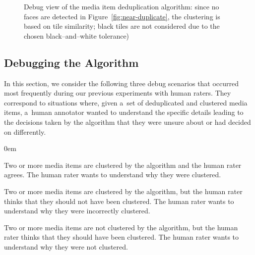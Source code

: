 \documentclass{article}
\begin{document}
\begin{figure}[t!]
  \centering
  \caption{Debug view of the media item deduplication algorithm: since no faces are detected in Figure~\ref{fig:near-duplicate}, the clustering is based on tile similarity; black tiles are not considered due to the chosen black--and--white tolerance)}
  \label{fig:algorithmdebug}
\end{figure}

\subsection{Debugging the Algorithm}
\label{sec:debugging-the-algorithm}
In this section, we consider the following three debug scenarios that occurred most frequently during our previous experiments with human raters. They correspond to situations where, given a~set of deduplicated and clustered media items, a~human annotator wanted to understand the specific details leading to the decisions taken by the algorithm that they were unsure about or had decided on differently.
\begin{description}
  \itemsep0em
  \item[Clustering Consent.] Two or more media items are clustered by the algorithm and the human rater agrees. The human rater wants to understand why they were clustered.
  \item[Clustering Dissent.] Two or more media items are clustered by the algorithm, but the human rater thinks that they should not have been clustered. The human rater wants to understand why they were incorrectly clustered.
  \item[Non-Clustering Dissent.] Two or more media items are not clustered by the algorithm, but the human rater thinks that they should have been clustered. The human rater wants to understand why they were not clustered.
\end{description}
\end{document}
